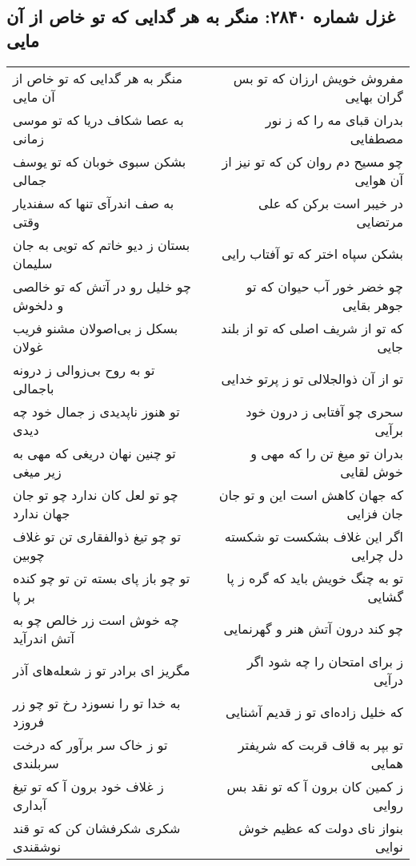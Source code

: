 \begin{center}
\section*{غزل شماره ۲۸۴۰: منگر به هر گدایی که تو خاص از آن مایی}
\label{sec:2840}
\begin{longtable}{l p{0.5cm} r}
منگر به هر گدایی که تو خاص از آن مایی
&&
مفروش خویش ارزان که تو بس گران بهایی
\\
به عصا شکاف دریا که تو موسی زمانی
&&
بدران قبای مه را که ز نور مصطفایی
\\
بشکن سبوی خوبان که تو یوسف جمالی
&&
چو مسیح دم روان کن که تو نیز از آن هوایی
\\
به صف اندرآی تنها که سفندیار وقتی
&&
در خیبر است برکن که علی مرتضایی
\\
بستان ز دیو خاتم که تویی به جان سلیمان
&&
بشکن سپاه اختر که تو آفتاب رایی
\\
چو خلیل رو در آتش که تو خالصی و دلخوش
&&
چو خضر خور آب حیوان که تو جوهر بقایی
\\
بسکل ز بی‌اصولان مشنو فریب غولان
&&
که تو از شریف اصلی که تو از بلند جایی
\\
تو به روح بی‌زوالی ز درونه باجمالی
&&
تو از آن ذوالجلالی تو ز پرتو خدایی
\\
تو هنوز ناپدیدی ز جمال خود چه دیدی
&&
سحری چو آفتابی ز درون خود برآیی
\\
تو چنین نهان دریغی که مهی به زیر میغی
&&
بدران تو میغ تن را که مهی و خوش لقایی
\\
چو تو لعل کان ندارد چو تو جان جهان ندارد
&&
که جهان کاهش است این و تو جان جان فزایی
\\
تو چو تیغ ذوالفقاری تن تو غلاف چوبین
&&
اگر این غلاف بشکست تو شکسته دل چرایی
\\
تو چو باز پای بسته تن تو چو کنده بر پا
&&
تو به چنگ خویش باید که گره ز پا گشایی
\\
چه خوش است زر خالص چو به آتش اندرآید
&&
چو کند درون آتش هنر و گهرنمایی
\\
مگریز ای برادر تو ز شعله‌های آذر
&&
ز برای امتحان را چه شود اگر درآیی
\\
به خدا تو را نسوزد رخ تو چو زر فروزد
&&
که خلیل زاده‌ای تو ز قدیم آشنایی
\\
تو ز خاک سر برآور که درخت سربلندی
&&
تو بپر به قاف قربت که شریفتر همایی
\\
ز غلاف خود برون آ که تو تیغ آبداری
&&
ز کمین کان برون آ که تو نقد بس روایی
\\
شکری شکرفشان کن که تو قند نوشقندی
&&
بنواز نای دولت که عظیم خوش نوایی
\\
\end{longtable}
\end{center}
